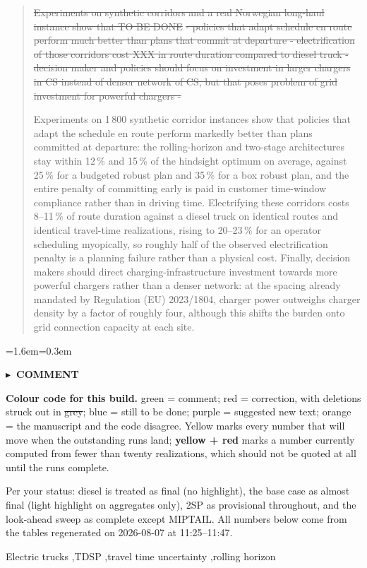 \documentclass[preprint,12pt,3p]{elsarticle}
\newcommand{\NEW}[1]{{\color{annpurple}#1}}
\newcommand{\DEL}[1]{{\color{anngray}\sout{#1}}}
\newcommand{\prov}[1]{{\setlength{\fboxsep}{1pt}\colorbox{provyellow}{#1}}}
\newcommand{\provlow}[1]{{\setlength{\fboxsep}{1pt}\colorbox{provyellow}{\color{annred}\textbf{#1}}}}
\newenvironment{ann}[2]{%
  \par\addvspace{4pt}%
  \begin{list}{}{\leftmargin=1.6em\rightmargin=0.3em\topsep=0pt\parsep=3pt\itemsep=0pt\listparindent=0pt}%
  \item[]\color{#1}\small\textbf{\textsf{#2}}\par\nopagebreak\vspace{1pt}\color{#1}\small\ignorespaces}
  {\end{list}\addvspace{4pt}}
\newenvironment{acmt}{\begin{ann}{anngreen}{$\blacktriangleright$\ COMMENT}}{\end{ann}}
\begin{document}
\begin{frontmatter}
\begin{abstract}
\DEL{Experiments on synthetic corridors and a real Norwegian long-haul instance show that TO BE DONE}
\DEL{- policies that adapt schedule en route perform much better than plans that commit at departure - electrification of those corridors cost XXX in route duration compared to diesel truck - decision maker and policies should focus on investment in larger chargers in CS instead of denser network of CS, but that poses problem of grid investment for powerful chargers -}

\NEW{Experiments on \prov{1\,800} synthetic corridor instances show that policies
that adapt the schedule en route perform markedly better than plans committed at
departure: the rolling-horizon and two-stage architectures stay within
\prov{12\,\%} and \prov{15\,\%} of the hindsight optimum on average, against
\prov{25\,\%} for a budgeted robust plan and \prov{35\,\%} for a box robust plan,
and the entire penalty of committing early is paid in customer time-window
compliance rather than in driving time. Electrifying these corridors costs
\prov{8--11\,\%} of route duration against a diesel truck on identical routes and
identical travel-time realizations, rising to \prov{20--23\,\%} for an operator
scheduling myopically, so roughly half of the observed electrification penalty is
a planning failure rather than a physical cost. Finally, decision makers should
direct charging-infrastructure investment towards more powerful chargers rather
than a denser network: at the spacing already mandated by Regulation (EU)
2023/1804, charger power outweighs charger density by a factor of roughly four,
although this shifts the burden onto grid connection capacity at each site.}
\end{abstract}

\begin{acmt}
\textbf{Colour code for this build.}
{\color{anngreen}green} = comment;
{\color{annred}red} = correction, with deletions struck out in {\color{anngray}\sout{grey}};
{\color{annblue}blue} = still to be done;
{\color{annpurple}purple} = suggested new text;
{\color{annorange}orange} = the manuscript and the code disagree.
\prov{Yellow} marks every number that will move when the outstanding runs land;
\provlow{yellow + red} marks a number currently computed from fewer than twenty
realizations, which should not be quoted at all until the runs complete.

\medskip
Per your status: diesel is treated as final (no highlight), the base case as
almost final (light highlight on aggregates only), 2SP as provisional
throughout, and the look-ahead sweep as complete except MIPTAIL.
All numbers below come from the tables regenerated on 2026-08-07 at 11:25--11:47.
\end{acmt}

\begin{keyword}
Electric trucks \sep TDSP \sep travel time uncertainty \sep rolling horizon
\end{keyword}
\end{frontmatter}
\end{document}
